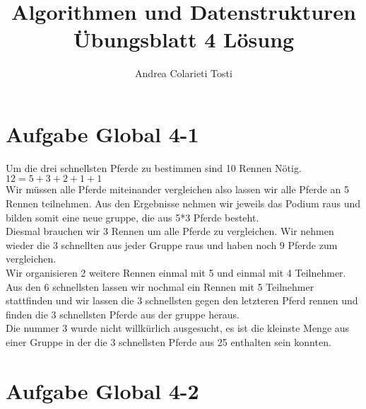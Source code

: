 \documentclass[12pt,a4paper]{article}
\author{Andrea Colarieti Tosti}
\title{Algorithmen und Datenstrukturen Übungsblatt 4 Lösung}
\begin{document}
\maketitle
\section{Aufgabe Global 4-1}
Um die drei schnellsten Pferde zu bestimmen sind 10 Rennen Nötig.\\
$12=5+3+2+1+1$ \\
Wir müssen alle Pferde miteinander vergleichen also lassen wir alle Pferde an 5 Rennen  teilnehmen. Aus den Ergebnisse nehmen wir jeweils das Podium raus und bilden somit eine neue gruppe, die aus 5*3 Pferde besteht.\\
Diesmal brauchen wir 3 Rennen um alle Pferde zu vergleichen. Wir nehmen wieder die 3 schnellten aus jeder Gruppe raus und haben noch 9 Pferde zum vergleichen.\\
Wir organisieren 2 weitere Rennen einmal mit 5 und einmal mit 4 Teilnehmer.
Aus den 6 schnellsten lassen wir nochmal ein Rennen mit 5 Teilnehmer stattfinden und wir lassen die 3 schnellsten gegen den letzteren Pferd rennen und finden die 3 schnellsten Pferde aus der gruppe heraus.\\
Die nummer 3 wurde nicht willkürlich ausgesucht, es ist die kleinste Menge aus einer Gruppe in der die 3 schnellsten Pferde aus 25 enthalten sein konnten.

\section{Aufgabe Global 4-2}
\end{document}
